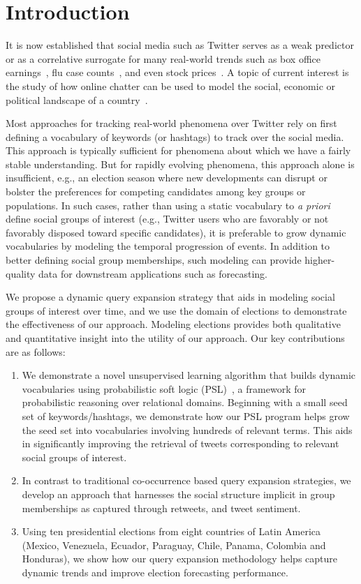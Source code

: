 
\section{Introduction}
It is now established that social media such as Twitter serves as a weak
predictor or as a correlative surrogate for many real-world trends such
as %
box office earnings~\cite{asur2010predicting}, flu case counts~\cite{culotta2010towards}, and even stock 
prices~\cite{bollen2011twitter}. A topic of current interest is the study of how
online chatter can be used to model
the social, economic or political landscape of a country~\cite{ramakrishnan2014beating}.

Most approaches for tracking real-world phenomena over Twitter rely on first defining a vocabulary
of keywords (or hashtags) to track over the social media. This approach is typically sufficient for
phenomena about which we have a fairly stable understanding. But for rapidly evolving phenomena, this approach alone is insufficient,
e.g., an election season where new developments can disrupt or bolster the preferences for competing candidates
among key groups or populations.
In such cases, rather than %
using a static vocabulary to {\it a priori} define social groups
of interest (e.g., Twitter users who are favorably or not favorably disposed
toward specific candidates), it is preferable to grow dynamic vocabularies by modeling the temporal progression of
events. In addition to better defining social group memberships, such modeling can provide
higher-quality data for downstream applications such as forecasting.

We propose a dynamic query expansion strategy that aids in modeling social groups of interest over time, and
we use the domain of elections to demonstrate the effectiveness of our approach. Modeling elections provides both
qualitative and quantitative insight into the utility of our approach.
Our key contributions are as follows:
\begin{enumerate}
\item We demonstrate
a novel unsupervised learning algorithm that builds dynamic vocabularies using probabilistic soft logic (PSL)~\cite{kimmig2012short}, a framework for probabilistic reasoning over relational domains. Beginning with a small seed set of keywords/hashtags, we demonstrate how our PSL program helps grow the seed set into  vocabularies involving hundreds of relevant terms. This aids in significantly improving the retrieval of tweets corresponding to relevant
social groups of interest.
\item In contrast to traditional co-occurrence based query expansion strategies, we develop an approach that harnesses the social structure implicit in group memberships as captured through retweets, and tweet sentiment.
\item Using ten presidential elections from eight countries of Latin America (Mexico, Venezuela, Ecuador, Paraguay, Chile, Panama, Colombia and Honduras), we show how our query expansion methodology helps capture dynamic trends and improve election forecasting performance. 
\end{enumerate}

